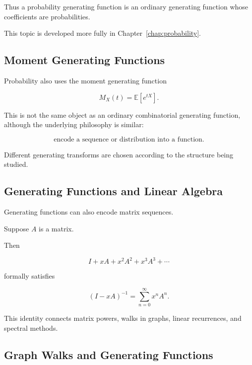 Thus a probability generating function is an ordinary generating
function whose coefficients are probabilities.

This topic is developed more fully in Chapter~\ref{chap:probability}.

\subsection{Moment Generating Functions}
\label{subsec:moment-generating-functions-preview}

Probability also uses the moment generating function

\[
\boxed{
M_X(t)
=
\mathbb{E}[e^{tX}].
}
\]

This is not the same object as an ordinary combinatorial generating
function, although the underlying philosophy is similar:

\[
\boxed{
\text{encode a sequence or distribution into a function}.
}
\]

Different generating transforms are chosen according to the structure
being studied.

\subsection{Generating Functions and Linear Algebra}
\label{subsec:generating-functions-linear-algebra}

Generating functions can also encode matrix sequences.

Suppose \(A\) is a matrix.

Then

\[
I+xA+x^2A^2+x^3A^3+\cdots
\]

formally satisfies

\[
\boxed{
(I-xA)^{-1}
=
\sum_{n=0}^{\infty}x^nA^n.
}
\]

This identity connects matrix powers, walks in graphs, linear
recurrences, and spectral methods.

\subsection{Graph Walks and Generating Functions}
\label{subsec:graph-walks-gf-preview}

